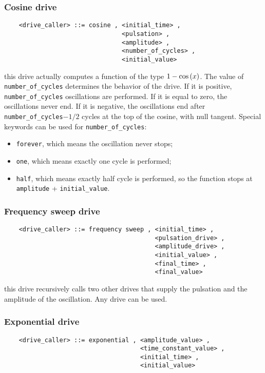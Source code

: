 \subsubsection{Cosine drive}
\begin{verbatim}
    <drive_caller> ::= cosine , <initial_time> ,
                                <pulsation> ,
                                <amplitude> ,
                                <number_of_cycles> , 
                                <initial_value>
\end{verbatim}
this drive actually computes a function of the type $ 1-\mathrm{cos}\left( x \right) $.
The value of \texttt{number\_of\_cycles} determines the behavior of the
drive. 
If it is positive, \texttt{number\_of\_cycles} oscillations are
performed. If it is equal to zero, the oscillations never end. 
If it is negative, the oscillations end after
\texttt{number\_of\_cycles}$-1/2$ cycles at the top of the cosine, with null
tangent.   
Special keywords can be used for \texttt{number\_of\_cycles}:
\begin{itemize}
	\item \texttt{forever}, which means the oscillation never stops;
	\item \texttt{one}, which means exactly one cycle is performed;
	\item \texttt{half}, which means exactly half cycle is performed,
	so the function stops at \texttt{amplitude} + \texttt{initial\_value}.
\end{itemize}

\subsubsection{Frequency sweep drive}
\begin{verbatim}
    <drive_caller> ::= frequency sweep , <initial_time> ,
                                         <pulsation_drive> ,
                                         <amplitude_drive> ,
                                         <initial_value> ,
                                         <final_time> ,
                                         <final_value>
\end{verbatim}
this drive recursively calls two other drives that supply the pulsation 
and the amplitude of the oscillation. Any drive can be used.

\subsubsection{Exponential drive}
\begin{verbatim}
    <drive_caller> ::= exponential , <amplitude_value> ,
                                     <time_constant_value> ,
                                     <initial_time> ,
                                     <initial_value>
\end{verbatim}

